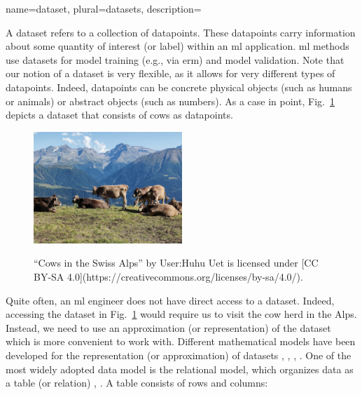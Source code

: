{name={dataset}, plural={datasets},
	description={A dataset refers to a collection of \glspl{datapoint}. These 
		\glspl{datapoint} carry information about some quantity of interest (or \gls{label}) within 
		an \gls{ml} application. \gls{ml} methods use datasets for \gls{model} training (e.g., via \gls{erm})
		and \gls{model} \gls{validation}. Note that our notion of a dataset is very flexible, as 
		it allows for very different types of \glspl{datapoint}. Indeed, \glspl{datapoint} can be concrete 
		physical objects (such as humans or animals) or abstract objects (such as numbers). 
		As a case in point, Fig.\ \ref{fig_cows_dataset} depicts a dataset that consists of cows as 
		\glspl{datapoint}. 
		\begin{figure}[H]
				\begin{center}
		\label{fig:cowsintheswissalps}
		\includegraphics[width=0.5\textwidth]{assets/Cows_in_the_Swiss_Alps.jpg}
		  \end{center}
		\caption{\label{fig_cows_dataset}“Cows in the Swiss Alps” by User:Huhu Uet is licensed under [CC BY-SA 4.0](https://creativecommons.org/licenses/by-sa/4.0/).}
	 	 \end{figure}
       		Quite often, an \gls{ml} engineer does not have direct access to a dataset. Indeed, accessing the 
       		dataset in Fig.\ \ref{fig_cows_dataset} would require us to visit the cow herd in the Alps. Instead, 
       		we need to use an approximation (or representation) of the dataset which is more convenient 
       		to work with. Different mathematical \glspl{model} have been developed for the representation (or approximation) 
       		of datasets \cite{silberschatz2019database}, \cite{abiteboul1995foundations}, \cite{hoberman2009data}, \cite{ramakrishnan2002database}. 
       		One of the most widely adopted data \gls{model} is the relational \gls{model}, which organizes \gls{data} 
       		as a table (or relation) \cite{codd1970relational}, \cite{silberschatz2019database}.
		A table consists of rows and columns:
}}
